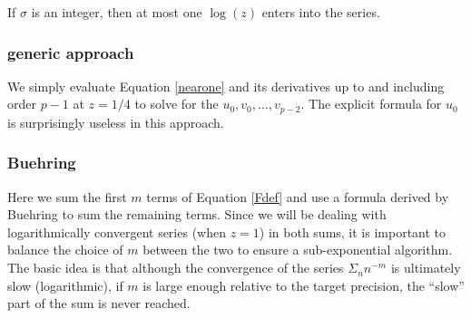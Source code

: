 \documentclass[12pt]{article}
\numberwithin{equation}{section}
\begin{document}
If $\sigma$ is an integer, then at most one $\log(z)$ enters into the series.

\subsubsection{generic approach}
We simply evaluate Equation \eqref{nearone} and its derivatives up to and including order $p-1$ at $z=1/4$ to solve for the $u_0,v_0,\dots,v_{p-2}$. The explicit formula for $u_0$ is surprisingly useless in this approach.

\subsubsection{Buehring}
Here we sum the first $m$ terms of Equation \eqref{Fdef} and use a formula derived by Buehring to sum the remaining terms. Since we will be dealing with logarithmically convergent series (when $z=1$) in both sums, it is important to balance the choice of $m$ between the two to ensure a sub-exponential algorithm. The basic idea is that although the convergence of the series $\Sigma_n n^{-m}$ is ultimately slow (logarithmic), if $m$ is large enough relative to the target precision, the ``slow'' part of the sum is never reached.
\end{document}
